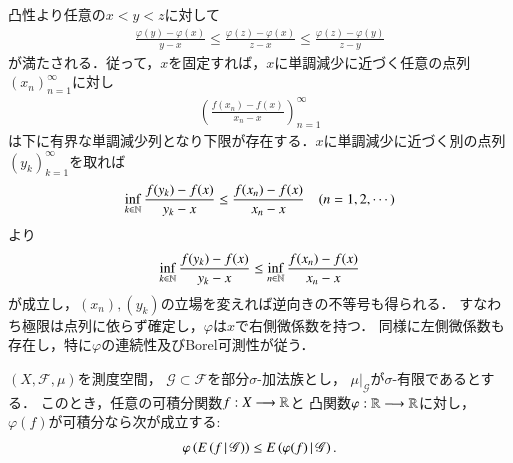 	\begin{prf}
		凸性より任意の$x < y < z$に対して
		\begin{align}
			\frac{\varphi(y) - \varphi(x)}{y - x} 
			\leq \frac{\varphi(z) - \varphi(x)}{z - x}
			\leq \frac{\varphi(z) - \varphi(y)}{z - y}
			\label{ineq:lem:convex_function_measurability_1}
		\end{align}
		が満たされる．従って，$x$を固定すれば，$x$に単調減少に近づく任意の点列$(x_n)_{n=1}^{\infty}$に対し
		 \begin{align}
		 	\left(\frac{f(x_n)-f(x)}{x_n-x}\right)_{n=1}^{\infty} 
		 	\label{seq:lem:convex_function_measurability_2}
		 \end{align}
		 は下に有界な単調減少列となり下限が存在する．$x$に単調減少に近づく別の点列$(y_k)_{k=1}^{\infty}$を取れば
		 \begin{align}
		 	\operatorname*{inf}_{k \in \mathbb{N}} \frac{f(y_k)-f(x)}{y_k-x} \leq \frac{f(x_n)-f(x)}{x_n-x} \quad (n=1,2,\cdots)
		 \end{align}
		 より
		 \begin{align}
		 	\operatorname*{inf}_{k \in \mathbb{N}} \frac{f(y_k)-f(x)}{y_k-x} \leq \operatorname*{inf}_{n \in \mathbb{N}} \frac{f(x_n)-f(x)}{x_n-x}
		 \end{align}
		 が成立し，$(x_n),(y_k)$の立場を変えれば逆向きの不等号も得られる．
		 すなわち極限は点列に依らず確定し，$\varphi$は$x$で右側微係数を持つ．
		 同様に左側微係数も存在し，特に$\varphi$の連続性及びBorel可測性が従う．
		 \QED
	\end{prf}
	
	\begin{screen}
		\begin{thm}[Jensenの不等式]
			$(X,\mathscr{F},\mu)$を測度空間，
			$\mathscr{G} \subset \mathscr{F}$を部分$\sigma$-加法族とし，
			$\left. \mu \right|_{\mathscr{G}}$が$\sigma$-有限であるとする．
			このとき，任意の可積分関数$f:X \longrightarrow \mathbb{R}$と
			凸関数$\varphi:\mathbb{R} \longrightarrow \mathbb{R}$に対し，
			$\varphi(f)$が可積分なら次が成立する:
			\begin{align}
				\varphi\left(E\left( f \, \middle|\, \mathscr{G} \right) \right)
				\leq E\left( \varphi(f) \, \middle|\, \mathscr{G} \right).
			\end{align}
		\end{thm}
	\end{screen}
	
